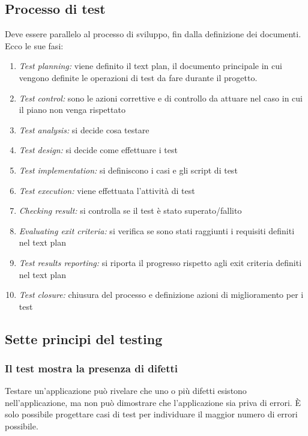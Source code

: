 \documentclass[10pt, a4paper]{article}
\begin{document}
\subsection{Processo di test}
Deve essere parallelo al processo di sviluppo, fin dalla definizione dei documenti. Ecco le sue fasi:
\begin{enumerate}
    \item \textit{Test planning:} viene definito il text plan, il documento principale in cui vengono definite le operazioni di test da fare durante il progetto.
    \item \textit{Test control:} sono le azioni correttive e di controllo da attuare nel caso in cui il piano non venga rispettato
    \item \textit{Test analysis:} si decide cosa testare
    \item \textit{Test design:} si decide come effettuare i test
    \item \textit{Test implementation:} si definiscono i casi e gli script di test
    \item \textit{Test execution:} viene effettuata l'attività di test
    \item \textit{Checking result:} si controlla se il test è stato superato/fallito
    \item \textit{Evaluating exit criteria:} si verifica se sono stati raggiunti i requisiti definiti nel text plan
    \item \textit{Test results reporting:} si riporta il progresso rispetto agli exit criteria definiti nel text plan
    \item \textit{Test closure:} chiusura del processo e definizione azioni di miglioramento per i test
\end{enumerate}

\subsection{Sette principi del testing}
\subsubsection*{Il test mostra la presenza di difetti}
Testare un'applicazione può rivelare che uno o più difetti esistono nell'applicazione, ma non può dimostrare che l'applicazione sia priva di errori. È solo possibile progettare casi di test per individuare il maggior numero di errori possibile.
\end{document}
